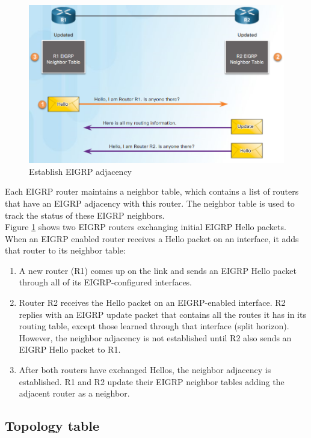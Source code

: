\begin{figure}[hbtp]
\caption{Establish EIGRP adjacency}\label{EIGRPadjacency}
\centering
\includegraphics[scale=0.6]{pictures/EIGRPadjacency.PNG}
\end{figure}

 
Each EIGRP router maintains a neighbor table, which contains a list of routers that have an EIGRP adjacency with this router. The neighbor table is used to track the status of these EIGRP neighbors.\\

Figure \ref{EIGRPadjacency} shows two EIGRP routers exchanging initial EIGRP Hello packets. When an EIGRP enabled router receives a Hello packet on an interface, it adds that router to its neighbor table:

\begin{enumerate}
\item A new router (R1) comes up on the link and sends an EIGRP Hello packet through all of its EIGRP-configured interfaces.

\item Router R2 receives the Hello packet on an EIGRP-enabled interface. R2 replies with an EIGRP update packet that contains all the routes it has in its routing table, except those learned through that interface (split horizon). However, the neighbor adjacency is not established until R2 also sends an EIGRP Hello packet to R1.

\item After both routers have exchanged Hellos, the neighbor adjacency is established. R1 and R2 update their EIGRP neighbor tables adding the adjacent router as a neighbor.
\end{enumerate}

\subsection{Topology table}


